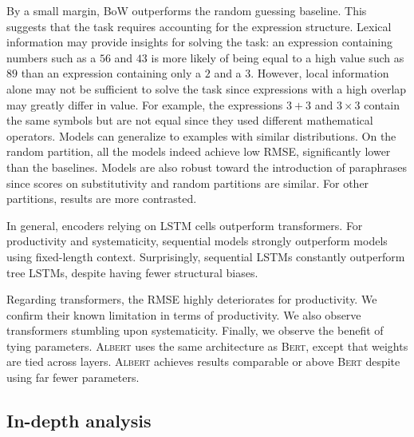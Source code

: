 By a small margin, BoW outperforms the random guessing baseline. This suggests that the task requires accounting for the expression structure. Lexical information may provide insights for solving the task: an expression containing numbers such as a $56$ and $43$ is more likely of being equal to a high value such as $89$ than an expression containing only a $2$ and a $3$. However, local information alone may not be sufficient to solve the task since expressions with a high overlap may greatly differ in value. For example, the expressions $3+3$ and $3\times3$ contain the same symbols but are not equal since they used different mathematical operators. 
Models can generalize to examples with similar distributions. On the random partition, all the models indeed achieve low RMSE, significantly lower than the baselines. Models are also robust toward the introduction of paraphrases since scores on substitutivity and random partitions are similar. For other partitions, results are more contrasted.

In general, encoders relying on LSTM cells outperform transformers. For productivity and systematicity, sequential models strongly outperform models using fixed-length context. Surprisingly, sequential LSTMs constantly outperform tree LSTMs, despite having fewer structural biases.

Regarding transformers, the RMSE highly deteriorates for productivity. We confirm their known limitation in terms of productivity. We also observe transformers stumbling upon systematicity. Finally, we observe the benefit of tying parameters. \textsc{Albert} uses the same architecture as \textsc{Bert}, except that weights are tied across layers. \textsc{Albert} achieves results comparable or above \textsc{Bert} despite using far fewer parameters.

\subsection{In-depth analysis} 


